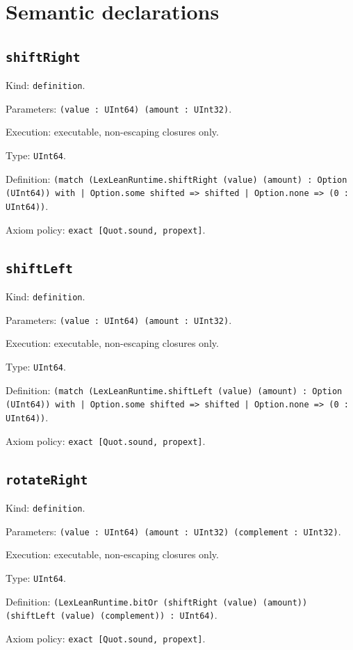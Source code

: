 \documentclass[11pt]{article}
\begin{document}
\section*{Semantic declarations}
\subsection*{\texttt{shiftRight}}
\noindent Kind: \texttt{definition}.\par
\noindent Parameters: \texttt{(value : UInt64) (amount : UInt32)}.\par
\noindent Execution: executable, non-escaping closures only.\par
\noindent Type: \texttt{UInt64}.\par
\noindent Definition: \texttt{(match (LexLeanRuntime.shiftRight (value) (amount) : Option (UInt64)) with | Option.some shifted => shifted | Option.none => (0 : UInt64))}.\par
\noindent Axiom policy: \texttt{exact [Quot.sound, propext]}.\par
\subsection*{\texttt{shiftLeft}}
\noindent Kind: \texttt{definition}.\par
\noindent Parameters: \texttt{(value : UInt64) (amount : UInt32)}.\par
\noindent Execution: executable, non-escaping closures only.\par
\noindent Type: \texttt{UInt64}.\par
\noindent Definition: \texttt{(match (LexLeanRuntime.shiftLeft (value) (amount) : Option (UInt64)) with | Option.some shifted => shifted | Option.none => (0 : UInt64))}.\par
\noindent Axiom policy: \texttt{exact [Quot.sound, propext]}.\par
\subsection*{\texttt{rotateRight}}
\noindent Kind: \texttt{definition}.\par
\noindent Parameters: \texttt{(value : UInt64) (amount : UInt32) (complement : UInt32)}.\par
\noindent Execution: executable, non-escaping closures only.\par
\noindent Type: \texttt{UInt64}.\par
\noindent Definition: \texttt{(LexLeanRuntime.bitOr (shiftRight (value) (amount)) (shiftLeft (value) (complement)) : UInt64)}.\par
\noindent Axiom policy: \texttt{exact [Quot.sound, propext]}.\par
\end{document}
